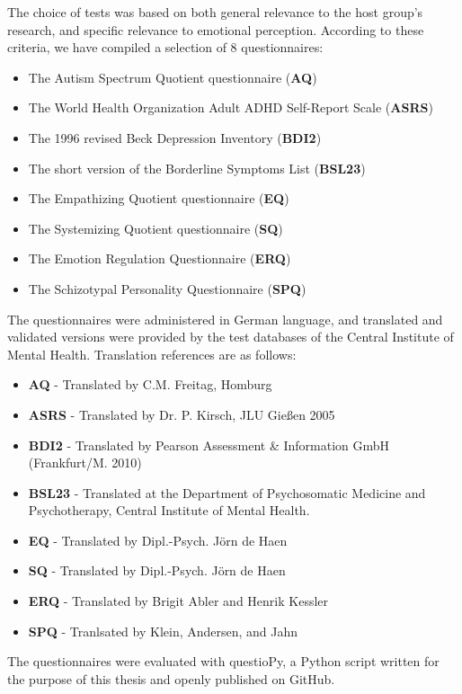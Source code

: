 	The choice of tests was based on both general relevance to the host group's research, and specific relevance to emotional perception.
	According to these criteria, we have compiled a selection of 8 questionnaires:
	\begin{itemize}
	    \item The Autism Spectrum Quotient questionnaire (\textbf{AQ}) \cite{Baron-Cohen2001}
	    \item The World Health Organization Adult ADHD Self-Report Scale (\textbf{ASRS}) \cite{Kessler2005}
	    \item The 1996 revised Beck Depression Inventory (\textbf{BDI2}) \cite{Beck1996}
	    \item The short version of the Borderline Symptoms List (\textbf{BSL23}) \cite{Bohus2009}
	    \item The Empathizing Quotient questionnaire (\textbf{EQ}) \cite{Baron-Cohen2004}
	    \item The Systemizing Quotient questionnaire (\textbf{SQ}) \cite{Baron-Cohen2003a}
	    \item The Emotion Regulation Questionnaire (\textbf{ERQ}) \cite{Gross2003}
	    \item The Schizotypal Personality Questionnaire (\textbf{SPQ}) \cite{Raine1991}
	\end{itemize}
	The questionnaires were administered in German language, and translated and validated versions were provided by the test databases of the Central Institute of Mental Health.
	Translation references are as follows:
	\begin{itemize}
	    \item \textbf{AQ} - Translated by C.M. Freitag, Homburg
	    \item \textbf{ASRS} - Translated by Dr. P. Kirsch, JLU Gießen 2005
	    \item \textbf{BDI2} - Translated by Pearson Assessment \& Information GmbH (Frankfurt/M. 2010)
	    \item \textbf{BSL23} - Translated at the Department of Psychosomatic Medicine and Psychotherapy, Central Institute of Mental Health.
	    \item \textbf{EQ} - Translated by Dipl.-Psych. Jörn de Haen
	    \item \textbf{SQ} - Translated by Dipl.-Psych. Jörn de Haen
	    \item \textbf{ERQ} - Translated by Brigit Abler and Henrik Kessler \cite{Abler2009}
	    \item \textbf{SPQ} - Tranlsated by Klein, Andersen, and Jahn \cite{Klein1997}
	\end{itemize}
	The questionnaires were evaluated with questioPy\cite{questiopy}, a Python script written for the purpose of this thesis and openly published on GitHub\cite{github}.
